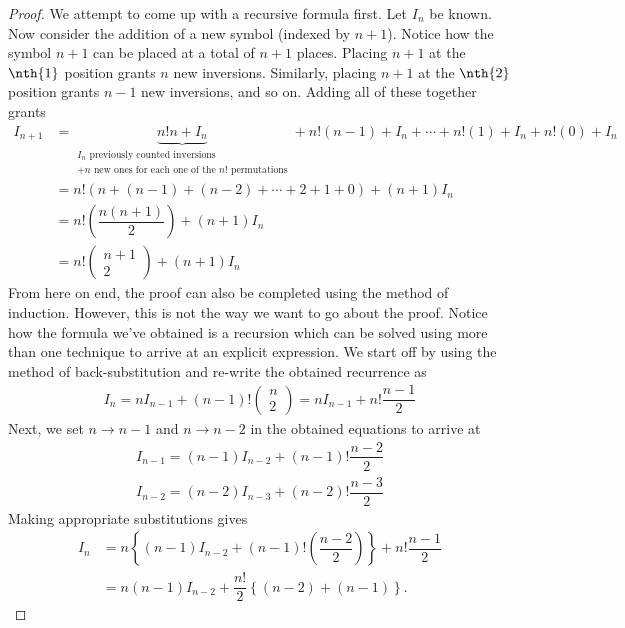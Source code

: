 \begin{proof}
We attempt to come up with a recursive formula first. Let $I_n$ be known. Now consider the addition of a new symbol (indexed by $n+1$). Notice how the symbol $n+1$ can be placed at a total of $n+1$ places. Placing $n+1$ at the $\nth{1}$ position grants $n$ new inversions. Similarly, placing $n+1$ at the $\nth{2}$ position grants $n-1$ new inversions, and so on. Adding all of these together grants 
\begin{align*}
I_{n+1}&=\underbrace{n!n + I_n}_{\substack{I_n \text{ previously counted inversions} \\ + n\text{ new ones for each one of the } n! \text{ permutations} }} + n!(n-1)+I_n + \cdots + n!(1)+I_n + n!(0)+I_n \\
	       &=n!\left(n+(n-1)+(n-2)+\cdots+2+1+0\right)+(n+1)I_n \\
	       &=n!\left(\dfrac{n(n+1)}{2}\right)+(n+1)I_n \\
	       &=n! \left(\begin{array}{c}n+1\\ 2\end{array}\right) + (n+1)I_n
\end{align*}
From here on end, the proof can also be completed using the method of induction. However, this is not the way we want to go about the proof. Notice how the formula we've obtained is a recursion which can be solved using more than one technique to arrive at an explicit expression. We start off by using the method of back-substitution and re-write the obtained recurrence as
\begin{align*}
	I_n = nI_{n-1}+(n-1)! \left(\begin{array}{c}n\\ 2\end{array}\right) = nI_{n-1}+n!\dfrac{n-1}{2}
\end{align*}
Next, we set $n\to n-1$ and $n\to n-2$ in the obtained equations to arrive at
\begin{align*}
	I_{n-1} = (n-1)I_{n-2} + (n-1)!\dfrac{n-2}{2} \\
	I_{n-2} = (n-2)I_{n-3} + (n-2)!\dfrac{n-3}{2} 
\end{align*}
Making appropriate substitutions gives
\begin{align*}
	I_n &= n\left\{(n-1)I_{n-2}+(n-1)!\left(\dfrac{n-2}{2}\right)\right\}+n!\dfrac{n-1}{2} \\
	    &= n(n-1)I_{n-2}+\dfrac{n!}{2}\left\{(n-2)+(n-1) \right\}.
\end{align*}

\end{proof}

